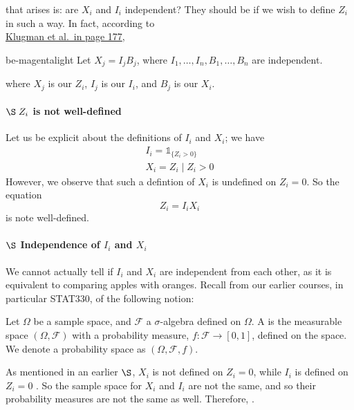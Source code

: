 \documentclass[notoc,notitlepage]{tufte-book}
\begin{document}
 that arises is: are $X_i$ and $I_i$ independent? They should be if we wish to define $Z_i$ in such a way. In fact, according to \\
\noindent\textcolor{be-magenta}{\underline{Klugman et al.\ in page 177}},

\begin{quotebox}{be-magenta}{light}
  Let $X_j = I_j B_j$, where $I_1, \ldots, I_n, B_1, \ldots, B_n$ are independent.
\end{quotebox}

where $X_j$ is our $Z_i$, $I_j$ is our $I_i$, and $B_j$ is our $X_i$.

\paragraph{$\S \; Z_i$ is not well-defined} Let us be explicit about the definitions of $I_i$ and $X_i$; we have
\begin{gather*}
  I_i = \mathbb{1}_{\{ Z_i > 0 \}} \\
  X_i = Z_i \mid Z_i > 0
\end{gather*}
However, we observe that such a defintion of $X_i$ is undefined on $Z_i = 0$. So the equation
\begin{equation*}
  Z_i = I_i X_i
\end{equation*}
is note well-defined.

\paragraph{$\S$ Independence of $I_i$ and $X_i$} We cannot actually tell if $I_i$ and $X_i$ are independent from each other, as it is equivalent to comparing apples with oranges. Recall from our earlier courses, in particular STAT330, of the following notion:

\begin{defnnonum}\label{defn:probability_space}
  Let $\Omega$ be a sample space, and $\mathcal{F}$ a $\sigma$-algebra defined on $\Omega$. A  is the measurable space $(\Omega, \mathcal{F})$ with a \textcolor{be-blue}{probability measure}, $f: \mathcal{F} \to [0, 1]$, defined on the space. We denote a probability space as $(\Omega, \mathcal{F}, f)$.
\end{defnnonum}

As mentioned in an earlier $\S$, $X_i$ is not defined on $Z_i = 0$, while $I_i$ is defined on $Z_i = 0$ . So the sample space for $X_i$ and $I_i$ are not the same, and so their probability measures are not the same as well. Therefore, .
\end{document}
